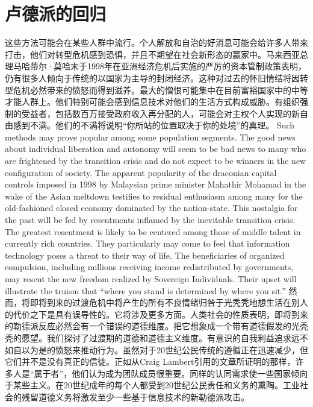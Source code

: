 \section{卢德派的回归}
\begin{paracol}{2}[]
这些方法可能会在某些人群中流行。个人解放和自治的好消息可能会给许多人带来打击，他们对转型危机感到恐惧，并且不期望在社会新形态的赢家中。马来西亚总理马哈蒂尔·莫哈末于1998年在亚洲经济危机后实施的严厉的资本管制政策表明，仍有很多人倾向于传统的以国家为主导的封闭经济。这种对过去的怀旧情结将因转型危机必然带来的愤怒而得到滋养。最大的憎恨可能集中在目前富裕国家中的中等才能人群上。他们特别可能会感到信息技术对他们的生活方式构成威胁。有组织强制的受益者，包括数百万接受政府收入再分配的人，可能会对主权个人实现的新自由感到不满。他们的不满将说明“你所站的位置取决于你的处境”的真理。
\switchcolumn
Such methods may prove popular among some population segments. The good news about individual liberation and autonomy will seem to be bad news to many who are frightened by the transition crisis and do not expect to be winners in the new configuration of society. The apparent popularity of the draconian capital controls imposed in 1998 by Malaysian prime minister Mahathir Mohamad in the wake of the Asian meltdown testifies to residual enthusiasm among many for the old-fashioned closed economy dominated by the nation-state. This nostalgia for the past will be fed by resentments inflamed by the inevitable transition crisis. The greatest resentment is likely to be centered among those of middle talent in currently rich countries. They particularly may come to feel that information technology poses a threat to their way of life. The beneficiaries of organized compulsion, including millions receiving income redistributed by governments, may resent the new freedom realized by Sovereign Individuals. Their upset will illustrate the truism that ``where you stand is determined by where you sit.'' 
\switchcolumn*
然而，将即将到来的过渡危机中将产生的所有不良情绪归咎于光秃秃地想生活在别人的代价之下是具有误导性的。它将涉及更多方面。人类社会的性质表明，即将到来的勒德派反应必然会有一个错误的道德维度。把它想象成一个带有道德假发的光秃秃的愿望。我们探讨了过渡期的道德和道德主义维度。有意识的自我利益追求远不如自以为是的愤怒来推动行为。虽然对于20世纪公民传统的遵循正在迅速减少，但它们并不是没有真正的信徒。正如从Craig Lambert引用的文章所证明的那样，许多人是“属于者”，他们认为成为团队成员很重要。同样的认同需求使一些国家倾向于某些主义。在20世纪成年的每个人都受到20世纪公民责任和义务的熏陶。工业社会的残留道德义务将激发至少一些基于信息技术的新勒德派攻击。
\switchcolumn

\end{paracol}
